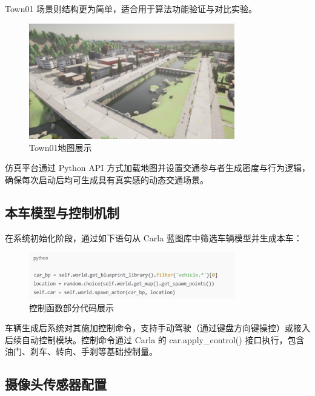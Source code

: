 Town01 场景则结构更为简单，适合用于算法功能验证与对比实验。

\begin{figure}[H]
    \centering
    \includegraphics[width=0.8\textwidth]{images/图5 Town01地图展示.pdf}  %
    \caption{Town01地图展示}
    \label{fig:example_image}  %
\end{figure}

仿真平台通过 Python API 方式加载地图并设置交通参与者生成密度与行为逻辑，确保每次启动后均可生成具有真实感的动态交通场景。

\subsection{本车模型与控制机制}

在系统初始化阶段，通过如下语句从 Carla 蓝图库中筛选车辆模型并生成本车：

\begin{figure}[H]
    \centering
    \includegraphics[width=0.8\textwidth]{images/图6 控制函数部分代码展示.pdf}  %
    \caption{控制函数部分代码展示}
    \label{fig:example_image}  %
\end{figure}

车辆生成后系统对其施加控制命令，支持手动驾驶（通过键盘方向键操控）或接入后续自动控制模块。控制命令通过 Carla 的 car.apply\_control() 接口执行，包含油门、刹车、转向、手刹等基础控制量。

\subsection{摄像头传感器配置}

